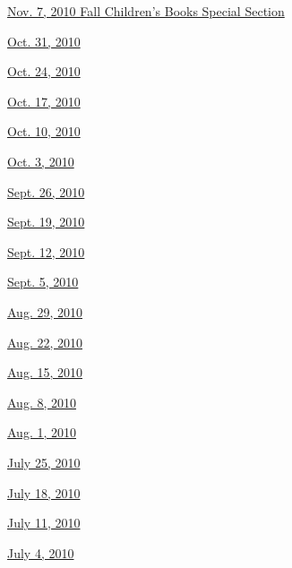 \href{http://www.nytimes3xbfgragh.onion/indexes/2010/11/06/books/review/index.html}{Nov.
7, 2010 \textbar{} Fall Children's Books Special Section}

\href{http://www.nytimes3xbfgragh.onion/indexes/2010/10/30/books/review/index.html}{Oct.
31, 2010}

\href{http://www.nytimes3xbfgragh.onion/indexes/2010/10/23/books/review/index.html}{Oct.
24, 2010}

\href{http://www.nytimes3xbfgragh.onion/indexes/2010/10/16/books/review/index.html}{Oct.
17, 2010}

\href{http://www.nytimes3xbfgragh.onion/indexes/2010/10/09/books/review/index.html}{Oct.
10, 2010}

\href{http://www.nytimes3xbfgragh.onion/indexes/2010/10/02/books/review/index.html}{Oct.
3, 2010}

\href{http://www.nytimes3xbfgragh.onion/indexes/2010/09/25/books/review/index.html}{Sept.
26, 2010}

\href{http://www.nytimes3xbfgragh.onion/indexes/2010/09/18/books/review/index.html}{Sept.
19, 2010}

\href{http://www.nytimes3xbfgragh.onion/indexes/2010/09/11/books/review/index.html}{Sept.
12, 2010}

\href{http://www.nytimes3xbfgragh.onion/indexes/2010/09/05/books/review/index.html}{Sept.
5, 2010}

\href{http://www.nytimes3xbfgragh.onion/indexes/2010/08/28/books/review/index.html}{Aug.
29, 2010}

\href{http://www.nytimes3xbfgragh.onion/indexes/2010/08/21/books/review/index.html}{Aug.
22, 2010}

\href{http://www.nytimes3xbfgragh.onion/indexes/2010/08/14/books/review/index.html}{Aug.
15, 2010}

\href{http://www.nytimes3xbfgragh.onion/indexes/2010/08/07/books/review/index.html}{Aug.
8, 2010}

\href{http://www.nytimes3xbfgragh.onion/indexes/2010/07/31/books/review/index.html}{Aug.
1, 2010}

\href{http://www.nytimes3xbfgragh.onion/indexes/2010/07/24/books/review/index.html}{July
25, 2010}

\href{http://www.nytimes3xbfgragh.onion/indexes/2010/07/17/books/review/index.html}{July
18, 2010}

\href{http://www.nytimes3xbfgragh.onion/indexes/2010/07/10/books/review/index.html}{July
11, 2010}

\href{http://www.nytimes3xbfgragh.onion/indexes/2010/07/03/books/review/index.html}{July
4, 2010}

